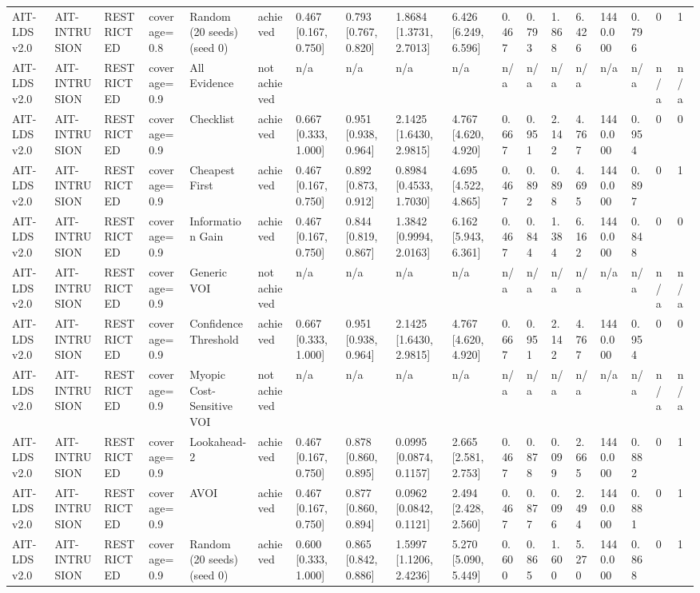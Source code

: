 \begin{table}[!ht]
{\begin{tabular}{llllllllllllllllll}
AIT-LDS v2.0 & AIT-INTRUSION & RESTRICTED & coverage=0.8 & Random (20 seeds) (seed 0) & achieved & 0.467 [0.167, 0.750] & 0.793 [0.767, 0.820] & 1.8684 [1.3731, 2.7013] & 6.426 [6.249, 6.596] & 0.467 & 0.793 & 1.868 & 6.426 & 1440.000 & 0.796 & 0 & 1 \\
AIT-LDS v2.0 & AIT-INTRUSION & RESTRICTED & coverage=0.9 & All Evidence & not achieved & n/a & n/a & n/a & n/a & n/a & n/a & n/a & n/a & n/a & n/a & n/a & n/a \\
AIT-LDS v2.0 & AIT-INTRUSION & RESTRICTED & coverage=0.9 & Checklist & achieved & 0.667 [0.333, 1.000] & 0.951 [0.938, 0.964] & 2.1425 [1.6430, 2.9815] & 4.767 [4.620, 4.920] & 0.667 & 0.951 & 2.142 & 4.767 & 1440.000 & 0.954 & 0 & 0 \\
AIT-LDS v2.0 & AIT-INTRUSION & RESTRICTED & coverage=0.9 & Cheapest First & achieved & 0.467 [0.167, 0.750] & 0.892 [0.873, 0.912] & 0.8984 [0.4533, 1.7030] & 4.695 [4.522, 4.865] & 0.467 & 0.892 & 0.898 & 4.695 & 1440.000 & 0.897 & 0 & 1 \\
AIT-LDS v2.0 & AIT-INTRUSION & RESTRICTED & coverage=0.9 & Information Gain & achieved & 0.467 [0.167, 0.750] & 0.844 [0.819, 0.867] & 1.3842 [0.9994, 2.0163] & 6.162 [5.943, 6.361] & 0.467 & 0.844 & 1.384 & 6.162 & 1440.000 & 0.848 & 0 & 0 \\
AIT-LDS v2.0 & AIT-INTRUSION & RESTRICTED & coverage=0.9 & Generic VOI & not achieved & n/a & n/a & n/a & n/a & n/a & n/a & n/a & n/a & n/a & n/a & n/a & n/a \\
AIT-LDS v2.0 & AIT-INTRUSION & RESTRICTED & coverage=0.9 & Confidence Threshold & achieved & 0.667 [0.333, 1.000] & 0.951 [0.938, 0.964] & 2.1425 [1.6430, 2.9815] & 4.767 [4.620, 4.920] & 0.667 & 0.951 & 2.142 & 4.767 & 1440.000 & 0.954 & 0 & 0 \\
AIT-LDS v2.0 & AIT-INTRUSION & RESTRICTED & coverage=0.9 & Myopic Cost-Sensitive VOI & not achieved & n/a & n/a & n/a & n/a & n/a & n/a & n/a & n/a & n/a & n/a & n/a & n/a \\
AIT-LDS v2.0 & AIT-INTRUSION & RESTRICTED & coverage=0.9 & Lookahead-2 & achieved & 0.467 [0.167, 0.750] & 0.878 [0.860, 0.895] & 0.0995 [0.0874, 0.1157] & 2.665 [2.581, 2.753] & 0.467 & 0.878 & 0.099 & 2.665 & 1440.000 & 0.882 & 0 & 1 \\
AIT-LDS v2.0 & AIT-INTRUSION & RESTRICTED & coverage=0.9 & AVOI & achieved & 0.467 [0.167, 0.750] & 0.877 [0.860, 0.894] & 0.0962 [0.0842, 0.1121] & 2.494 [2.428, 2.560] & 0.467 & 0.877 & 0.096 & 2.494 & 1440.000 & 0.881 & 0 & 1 \\
AIT-LDS v2.0 & AIT-INTRUSION & RESTRICTED & coverage=0.9 & Random (20 seeds) (seed 0) & achieved & 0.600 [0.333, 1.000] & 0.865 [0.842, 0.886] & 1.5997 [1.1206, 2.4236] & 5.270 [5.090, 5.449] & 0.600 & 0.865 & 1.600 & 5.270 & 1440.000 & 0.868 & 0 & 1 \\

\end{tabular}}
\end{table}
